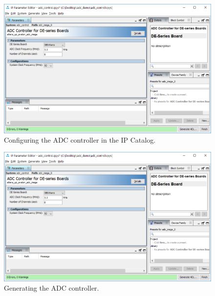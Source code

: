 \documentclass[11pt, twoside, pdftex]{article}
\begin{document}
\begin {figure} [H]
\begin {center}
\includegraphics [scale = 0.6] {figures/ipcatalog2.png}
\end {center}
\caption {Configuring the ADC controller in the IP Catalog.}
\label {fig:ipcatalog2}
\end {figure}

\begin {figure} [H]
\begin {center}
\includegraphics [scale = 0.6] {figures/ipcatalog3.png}
\end {center}
\caption {Generating the ADC controller.}
\label {fig:ipcatalog3}
\end {figure}
\end{document}
